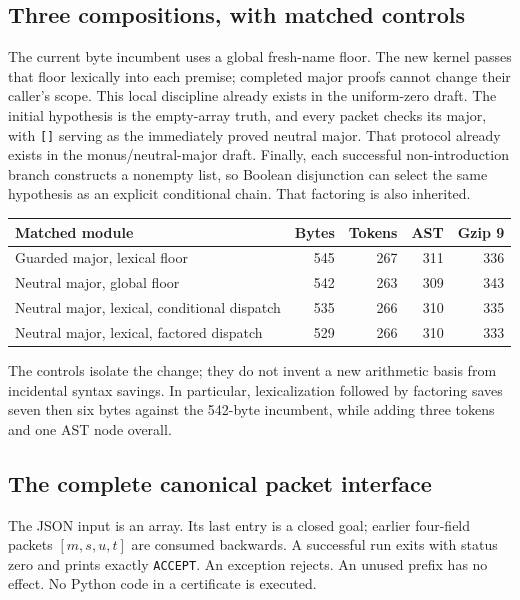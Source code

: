 \documentclass[11pt,letterpaper]{article}
\theoremstyle{definition}\newtheorem{definition}[theorem]{Definition}
\theoremstyle{remark}\newtheorem{remark}[theorem]{Remark}
\begin{document}
\subsection{Three compositions, with matched controls}

The current byte incumbent uses a global fresh-name floor. The new kernel
passes that floor lexically into each premise; completed major proofs cannot
change their caller's scope. This local discipline already exists in the
uniform-zero draft. The initial hypothesis is the empty-array truth, and
every packet checks its major, with \texttt{[]} serving as the immediately
proved neutral major. That protocol already exists in the monus/neutral-major
draft. Finally, each successful non-introduction branch constructs a nonempty
list, so Boolean disjunction can select the same hypothesis as an explicit
conditional chain. That factoring is also inherited.

\begin{center}\small
\begin{tabular}{@{}lrrrr@{}}
\toprule
Matched module & Bytes & Tokens & AST & Gzip 9\\\midrule
Guarded major, lexical floor & 545 & 267 & 311 & 336\\
Neutral major, global floor & 542 & 263 & 309 & 343\\
Neutral major, lexical, conditional dispatch & 535 & 266 & 310 & 335\\
Neutral major, lexical, factored dispatch & 529 & 266 & 310 & 333\\
\bottomrule
\end{tabular}
\end{center}

The controls isolate the change; they do not invent a new arithmetic basis
from incidental syntax savings. In particular, lexicalization followed by
factoring saves seven then six bytes against the 542-byte incumbent, while
adding three tokens and one AST node overall.

\subsection{The complete canonical packet interface}

The JSON input is an array. Its last entry is a closed goal; earlier
four-field packets $[m,s,u,t]$ are consumed backwards. A successful run
exits with status zero and prints exactly \texttt{ACCEPT}. An exception
rejects. An unused prefix has no effect. No Python code in a certificate
is executed.
\end{document}

